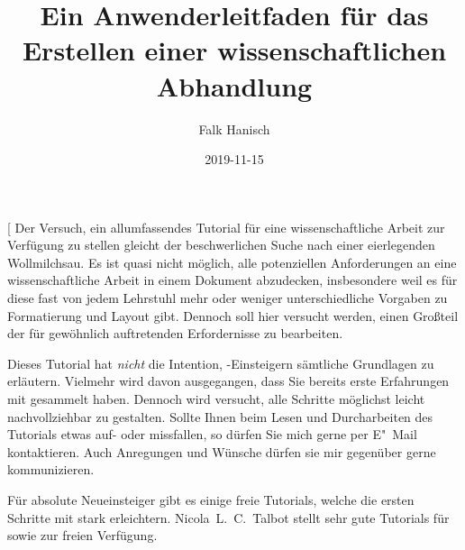 \documentclass[%
  english,ngerman,%
  cdgeometry=no,DIV=12,%
  cd=false,cdfont=false,cdtitle=true,%
  headings=normal,%
  automark,%
  listof=toc,%
]{tudscrartcl}
\begin{document}
\subject{Tutorial für }
\title{%
  Ein Anwenderleitfaden für das Erstellen einer wissenschaftlichen Abhandlung%
}
\author{Falk Hanisch\TUDScriptContactTitle}
\date{2019-11-15}

\makeatletter
\begingroup%
  \def\and{, }%
  \let\thanks\@gobble%
  \let\footnote\@gobble%
  \let\emailaddress\@gobble%
\endgroup%
\makeatother

\StartTutorial[%
  Der Versuch, ein allumfassendes Tutorial für eine wissenschaftliche Arbeit 
  zur Verfügung zu stellen gleicht der beschwerlichen Suche nach einer 
  eierlegenden Wollmilchsau. Es ist quasi nicht möglich, alle potenziellen 
  Anforderungen an eine wissenschaftliche Arbeit in einem Dokument abzudecken, 
  insbesondere weil es für diese fast von jedem Lehrstuhl mehr oder weniger 
  unterschiedliche Vorgaben zu Formatierung und Layout gibt. Dennoch soll hier 
  versucht werden, einen Großteil der für gewöhnlich auftretenden Erfordernisse
  zu bearbeiten.
  
  Dieses Tutorial hat \emph{nicht} die Intention, -Einsteigern 
  sämtliche Grundlagen zu erläutern. Vielmehr wird davon ausgegangen, dass Sie 
  bereits erste Erfahrungen mit  gesammelt haben. Dennoch wird 
  versucht, alle Schritte möglichst leicht nachvollziehbar zu gestalten. Sollte 
  Ihnen beim Lesen und Durcharbeiten des Tutorials etwas auf- oder missfallen, 
  so dürfen Sie mich gerne per E"~Mail kontaktieren. Auch Anregungen und 
  Wünsche dürfen sie mir gegenüber gerne kommunizieren.
  
  Für absolute Neueinsteiger gibt es einige freie Tutorials, welche die ersten 
  Schritte mit  stark erleichtern. Nicola~L.~C.~Talbot stellt 
  sehr gute Tutorials für 
  \cite{talbot2012} sowie 
  \cite{talbot2013} zur freien Verfügung.
  
\end{document}
